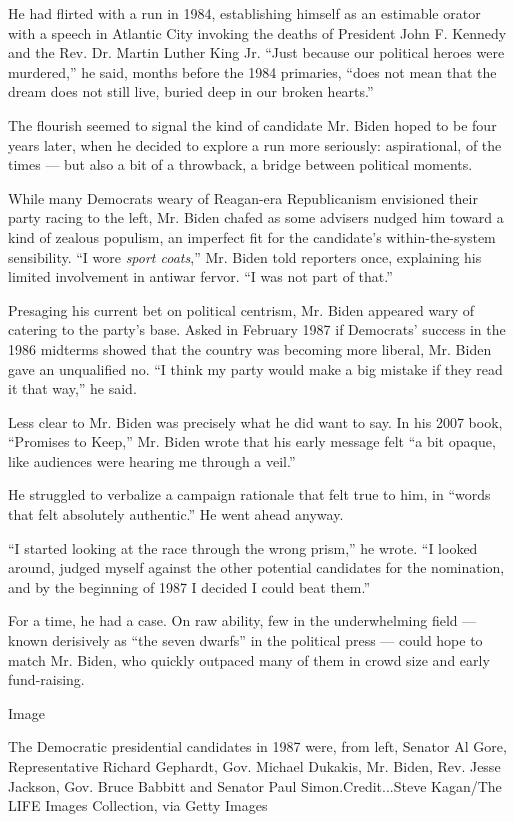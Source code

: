 He had flirted with a run in 1984, establishing himself as an estimable
orator with a speech in Atlantic City invoking the deaths of President
John F. Kennedy and the Rev. Dr. Martin Luther King Jr. ``Just because
our political heroes were murdered,'' he said, months before the 1984
primaries, ``does not mean that the dream does not still live, buried
deep in our broken hearts.''

The flourish seemed to signal the kind of candidate Mr. Biden hoped to
be four years later, when he decided to explore a run more seriously:
aspirational, of the times --- but also a bit of a throwback, a bridge
between political moments.

While many Democrats weary of Reagan-era Republicanism envisioned their
party racing to the left, Mr. Biden chafed as some advisers nudged him
toward a kind of zealous populism, an imperfect fit for the candidate's
within-the-system sensibility. ``I wore \emph{sport coats},'' Mr. Biden
told reporters once, explaining his limited involvement in antiwar
fervor. ``I was not part of that.''

Presaging his current bet on political centrism, Mr. Biden appeared wary
of catering to the party's base. Asked in February 1987 if Democrats'
success in the 1986 midterms showed that the country was becoming more
liberal, Mr. Biden gave an unqualified no. ``I think my party would make
a big mistake if they read it that way,'' he said.

Less clear to Mr. Biden was precisely what he did want to say. In his
2007 book, ``Promises to Keep,'' Mr. Biden wrote that his early message
felt ``a bit opaque, like audiences were hearing me through a veil.''

He struggled to verbalize a campaign rationale that felt true to him, in
``words that felt absolutely authentic.'' He went ahead anyway.

``I started looking at the race through the wrong prism,'' he wrote. ``I
looked around, judged myself against the other potential candidates for
the nomination, and by the beginning of 1987 I decided I could beat
them.''

For a time, he had a case. On raw ability, few in the underwhelming
field --- known derisively as ``the seven dwarfs'' in the political
press --- could hope to match Mr. Biden, who quickly outpaced many of
them in crowd size and early fund-raising.

Image

The Democratic presidential candidates in 1987 were, from left, Senator
Al Gore, Representative Richard Gephardt, Gov. Michael Dukakis, Mr.
Biden, Rev. Jesse Jackson, Gov. Bruce Babbitt and Senator Paul
Simon.Credit...Steve Kagan/The LIFE Images Collection, via Getty Images


